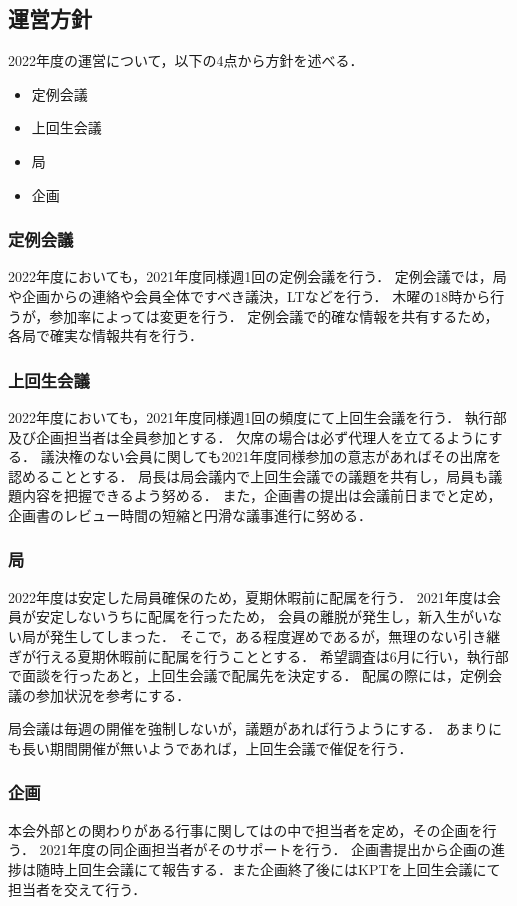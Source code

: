 \subsection*{運営方針}


2022年度の運営について，以下の4点から方針を述べる．
\begin{itemize}
    \item 定例会議
    \item 上回生会議
    \item 局
    \item 企画
\end{itemize}

\subsubsection*{定例会議}
2022年度においても，2021年度同様週1回の定例会議を行う．
定例会議では，局や企画からの連絡や会員全体ですべき議決，LTなどを行う．
木曜の18時から行うが，参加率によっては変更を行う．
定例会議で的確な情報を共有するため，各局で確実な情報共有を行う．

\subsubsection*{上回生会議}
2022年度においても，2021年度同様週1回の頻度にて上回生会議を行う．
執行部及び企画担当者は全員参加とする．
欠席の場合は必ず代理人を立てるようにする．
議決権のない会員に関しても2021年度同様参加の意志があればその出席を認めることとする．
局長は局会議内で上回生会議での議題を共有し，局員も議題内容を把握できるよう努める．
また，企画書の提出は会議前日までと定め，企画書のレビュー時間の短縮と円滑な議事進行に努める．

\subsubsection*{局}
2022年度は安定した局員確保のため，夏期休暇前に配属を行う．
2021年度は会員が安定しないうちに配属を行ったため，
会員の離脱が発生し，新入生がいない局が発生してしまった．
そこで，ある程度遅めであるが，無理のない引き継ぎが行える夏期休暇前に配属を行うこととする．
希望調査は6月に行い，執行部で面談を行ったあと，上回生会議で配属先を決定する．
配属の際には，定例会議の参加状況を参考にする．

局会議は毎週の開催を強制しないが，議題があれば行うようにする．
あまりにも長い期間開催が無いようであれば，上回生会議で催促を行う．

\subsubsection*{企画}
本会外部との関わりがある行事に関しては\secondGrade{}の中で担当者を定め，その企画を行う．
2021年度の同企画担当者がそのサポートを行う．
企画書提出から企画の進捗は随時上回生会議にて報告する．また企画終了後にはKPTを上回生会議にて担当者を交えて行う．
